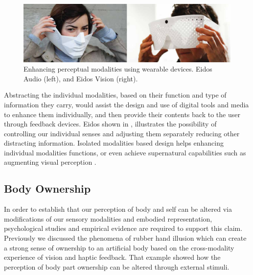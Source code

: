 \begin{figure}[t!]
  \centering
	  \includegraphics[width=1\linewidth]{figures/intro/Eidos.pdf}
  \captionsetup{justification=centering}
  \caption{Enhancing perceptual modalities using wearable devices. Eidos Audio (left), and Eidos Vision (right). }
  \label{fig:intro-eidos}
  \text{\footnotesize Photo \copyright\xspace Eidos (2012).}
\end{figure}

Abstracting the individual modalities, based on their function and type of information they carry, would assist the design and use of digital tools and media to enhance them individually, and then provide their contents back to the user through feedback devices. Eidos \cite{tim2012eidos} shown in , illustrates the possibility of controlling our individual senses and adjusting them separately reducing other distracting information. Isolated modalities based design helps enhancing individual modalities functions, or even achieve supernatural capabilities such as augmenting visual perception \cite{koizumi2012stop}. 


\subsection{Body Ownership}
In order to establish that our perception of body and self can be altered via modifications of our sensory modalities and embodied representation, psychological studies and empirical evidence are required to support this claim. Previously we discussed the phenomena of rubber hand illusion which can create a strong sense of ownership to an artificial body based on the cross-modality experience of vision and haptic feedback. That example showed how the perception of body part ownership can be altered through external stimuli. 

